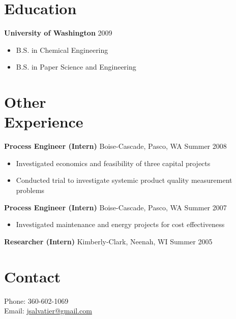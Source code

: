 \documentclass[margin]{res}
\newcommand{\bitem}{\begin{itemize} \itemsep -2pt}
\newcommand{\hrowbase}[3]{
  {\bf #1} #2 \hfill #3
}
\newcommand{\headrow}[3]{
  \hrowbase{#1}{#2}{#3}
    \vspace{6pt}
    \bitem
      }
\newcommand{\eheadrow}[0]{\end{itemize}}
\newcommand{\email}[1]{ \href{mailto:#1}{#1}}
\begin{document}
\begin{resume}
\section{Education} 
  \headrow{University of Washington}{}{2009}
      \item B.S. in Chemical Engineering
      \item B.S. in Paper Science and Engineering
  \eheadrow
    
\section{Other \\ Experience}
    \headrow{Process Engineer (Intern)}{Boise-Cascade, Pasco, WA}{Summer 2008}
      \item Investigated economics and feasibility of three capital projects 
      \item Conducted trial to investigate systemic product quality measurement problems 
    \eheadrow

    \headrow{Process Engineer (Intern)}{Boise-Cascade, Pasco, WA}{Summer 2007}
      \item Investigated maintenance and energy projects for cost effectiveness 
    \eheadrow

    {\bf Researcher (Intern)} Kimberly-Clark, Neenah, WI \hfill  Summer 2005

\section{Contact}
     Phone: 360-602-1069 \\
     Email: \email{jsalvatier@gmail.com}


\end{resume} 
\end{document}
